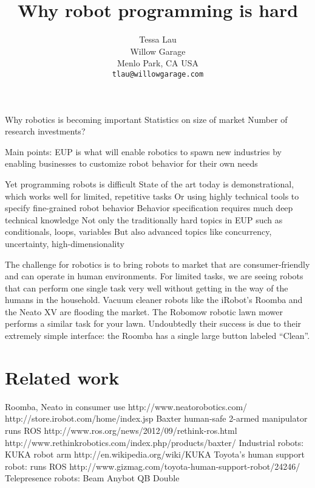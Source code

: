 \documentclass{article}
\begin{document}
\title {Why robot programming is hard}
\author {Tessa Lau \\
Willow Garage \\
Menlo Park, CA USA \\
{\tt tlau@willowgarage.com}
}
\maketitle

Why robotics is becoming important
Statistics on size of market
Number of research investments?

Main points:
	EUP is what will enable robotics to spawn new industries
	by enabling businesses to customize robot behavior for their own needs

	Yet programming robots is difficult
	State of the art today is demonstrational, which works well for limited, repetitive tasks
	Or using highly technical tools to specify fine-grained robot behavior
	Behavior specification requires much deep technical knowledge
	Not only the traditionally hard topics in EUP such as conditionals, loops, variables
	But also advanced topics like concurrency, uncertainty, high-dimensionality

The challenge for robotics is to bring robots to market that are consumer-friendly and can operate in human environments. For limited tasks, we are seeing robots that can perform one single task very well without getting in the way of the humans in the household. Vacuum cleaner robots like the iRobot's Roomba and the Neato XV are flooding the market. The Robomow robotic lawn mower performs a similar task for your lawn. Undoubtedly their success is due to their extremely simple interface: the Roomba has a single large button labeled ``Clean''.



\section{Related work}

Roomba, Neato in consumer use
	http://www.neatorobotics.com/
	http://store.irobot.com/home/index.jsp
Baxter human-safe 2-armed manipulator
	runs ROS
	http://www.ros.org/news/2012/09/rethink-ros.html
	http://www.rethinkrobotics.com/index.php/products/baxter/
Industrial robots:
	KUKA robot arm http://en.wikipedia.org/wiki/KUKA
Toyota's human support robot:
	runs ROS
	http://www.gizmag.com/toyota-human-support-robot/24246/
Telepresence robots:
	Beam
	Anybot QB
	Double
\end{document}
